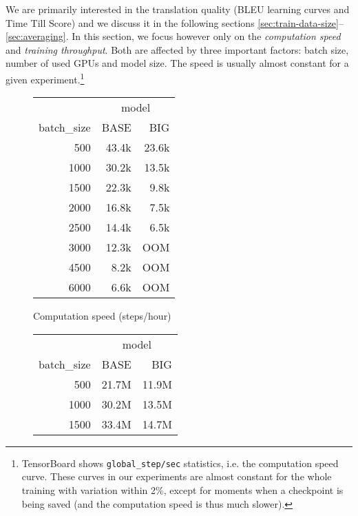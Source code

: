 \documentclass{pbmlarxiv} \pdfoutput=1
\begin{document}
We are primarily interested in the translation quality (BLEU learning curves and Time Till Score)
 and we discuss it in the following sections \ref{sec:train-data-size}--\ref{sec:averaging}.
In this section, we focus however only on the \emph{computation speed} and \emph{training throughput}.
Both are affected by three important factors: batch size, number of used GPUs and model size.
The speed is usually almost constant for a given experiment.\footnote{
 TensorBoard shows \texttt{global\_step/sec} statistics, i.e. the computation speed curve.
 These curves in our experiments are almost constant for the whole training
  with variation within 2\%, except for moments
  when a checkpoint is being saved (and the computation speed is thus much slower).
}

\begin{table}[htb]\centering
\begin{subfigure}[b]{0.45\textwidth}
 \begin{tabular}{r|rr}\hline
            & \multicolumn{2}{c}{model} \\
 batch\_size&  BASE & BIG \\\hline
  500       & 43.4k & 23.6k \\
 1000       & 30.2k & 13.5k \\
 1500       & 22.3k &  9.8k \\
 2000       & 16.8k &  7.5k \\
 2500       & 14.4k &  6.5k \\
 3000       & 12.3k & OOM \\
 4500       &  8.2k & OOM \\
 6000       &  6.6k & OOM \\\hline
 \end{tabular}
 \caption{Computation speed (steps/hour)}
 \label{tab:speed-a}
\end{subfigure}
\begin{subfigure}[b]{0.45\textwidth}
 \begin{tabular}{r|rr}\hline
            & \multicolumn{2}{c}{model} \\
 batch\_size&  BASE & BIG \\\hline
  500       & 21.7M & 11.9M \\
 1000       & 30.2M & 13.5M \\
 1500       & 33.4M & 14.7M \\

\end{tabular}
\end{subfigure}
\end{table}
\end{document}

